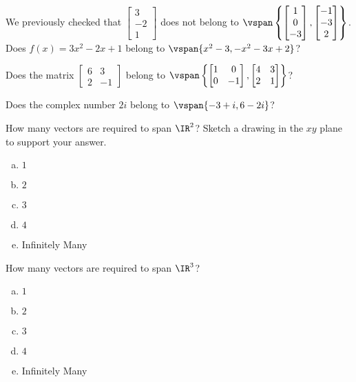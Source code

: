 \begin{applicationActivities}
\begin{activity}{5}
  We previously checked that \(\begin{bmatrix}3\\-2\\1\end{bmatrix}\)
  does not belong to
  \(\vspan\left\{\begin{bmatrix}1\\0\\-3\end{bmatrix},
  \begin{bmatrix}-1\\-3\\2\end{bmatrix}\right\}\).
  Does \(f(x)=3x^2-2x+1\) belong to
  \(\vspan\{x^2-3,-x^2-3x+2\}\)?
\end{activity}

\begin{activity}{10}
  Does the matrix \(\begin{bmatrix}6&3\\2&-1\end{bmatrix}\) belong to
  \(\vspan\left\{\begin{bmatrix}1&0\\0&-1\end{bmatrix},
  \begin{bmatrix}4&3\\2&1\end{bmatrix}\right\}\)?
\end{activity}

\begin{activity}{10}
  Does the complex number \(2i\) belong to
  \(\vspan\{-3+i,6-2i\}\)?
\end{activity}

\begin{activity}{10}
  How many vectors are required to span \(\IR^2\)?
  Sketch a drawing in the \(xy\) plane to support your answer.
  \begin{enumerate}[(a)]
  \item $1$
  \item $2$
  \item $3$
  \item $4$
  \item Infinitely Many
  \end{enumerate}
\end{activity}

\begin{activity}{5}
  How many vectors are required to span \(\IR^3\)?
  \begin{enumerate}[(a)]
  \item $1$
  \item $2$
  \item $3$
  \item $4$
  \item Infinitely Many
  \end{enumerate}
\end{activity}


\end{applicationActivities}
